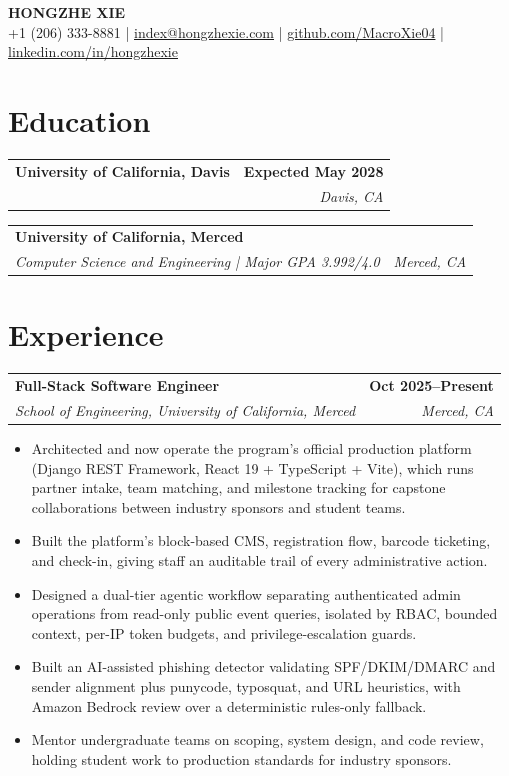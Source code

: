 \documentclass[10pt,letterpaper]{article}
\makeatletter
\newcommand{\resumeEntry}[4]{%
  \begin{tabular*}{\textwidth}{@{\extracolsep{\fill}}lr}
    \textbf{#1} & \textbf{#2} \\
    \textit{#3} & \textit{#4}
  \end{tabular*}\vspace{-2pt}
}
\makeatother
\begin{document}
\begin{center}
  {\fontsize{20}{22}\selectfont\textbf{HONGZHE XIE}}\\[-1pt]
  {\small
    +1 (206) 333-8881 \;|\;
    \href{mailto:index@hongzhexie.com}{index@hongzhexie.com} \;|\;
    \href{https://github.com/MacroXie04}{github.com/MacroXie04} \;|\;
    \href{https://www.linkedin.com/in/hongzhexie/}{linkedin.com/in/hongzhexie}
  }
\end{center}
\vspace{-7pt}

\section{Education}
\resumeEntry
  {University of California, Davis}
  {Expected May 2028}
  {}
  {Davis, CA}

\resumeEntry
  {University of California, Merced}
  {}
  {Computer Science and Engineering \;|\; Major GPA 3.992/4.0}
  {Merced, CA}

\section{Experience}
\resumeEntry
  {Full-Stack Software Engineer}
  {Oct 2025--Present}
  {School of Engineering, University of California, Merced}
  {Merced, CA}
\begin{itemize}
  \item Architected and now operate the program's official production platform (Django REST Framework, React 19 + TypeScript + Vite), which runs partner intake, team matching, and milestone tracking for capstone collaborations between industry sponsors and student teams.
  \item Built the platform's block-based CMS, registration flow, barcode ticketing, and check-in, giving staff an auditable trail of every administrative action.
  \item Designed a dual-tier agentic workflow separating authenticated admin operations from read-only public event queries, isolated by RBAC, bounded context, per-IP token budgets, and privilege-escalation guards.
  \item Built an AI-assisted phishing detector validating SPF/DKIM/DMARC and sender alignment plus punycode, typosquat, and URL heuristics, with Amazon Bedrock review over a deterministic rules-only fallback.
  \item Mentor undergraduate teams on scoping, system design, and code review, holding student work to production standards for industry sponsors.
\end{itemize}
\end{document}
